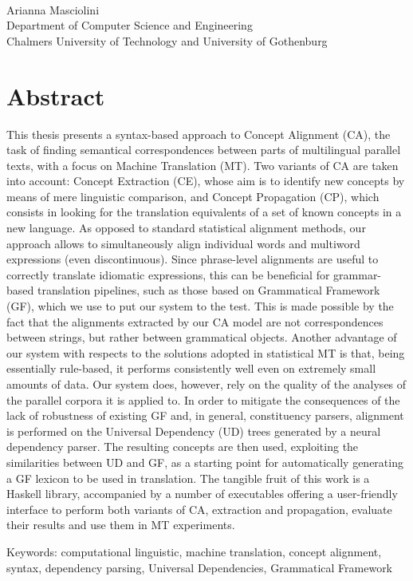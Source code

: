 \oneLineTitle\\
Arianna Masciolini\\
Department of Computer Science and Engineering\\
Chalmers University of Technology and University of Gothenburg\setlength{\parskip}{0.5cm}

\thispagestyle{plain}
\setlength{\parskip}{0pt plus 1.0pt}
\section*{Abstract}
This thesis presents a syntax-based approach to Concept Alignment (CA), the task of finding semantical correspondences between parts of multilingual parallel texts, with a focus on Machine Translation (MT).
Two variants of CA are taken into account: Concept Extraction (CE), whose aim is to identify new concepts by means of mere linguistic comparison, and Concept Propagation (CP), which consists in looking for the translation equivalents of a set of known concepts in a new language.
As opposed to standard statistical alignment methods, our approach allows to simultaneously align individual words and multiword expressions (even discontinuous). 
Since phrase-level alignments are useful to correctly translate idiomatic expressions, this can be beneficial for grammar-based translation pipelines, such as those based on Grammatical Framework (GF), which we use to put our system to the test. 
This is made possible by the fact that the alignments extracted by our CA model are not correspondences between strings, but rather between grammatical objects.
Another advantage of our system with respects to the solutions adopted in statistical MT is that, being essentially rule-based, it performs consistently well even on extremely small amounts of data.
Our system does, however, rely on the quality of the analyses of the parallel corpora it is applied to.
In order to mitigate the consequences of the lack of robustness of existing GF and, in general, constituency parsers, alignment is performed on the Universal Dependency (UD) trees generated by a neural dependency parser.
The resulting concepts are then used, exploiting the similarities between UD and GF, as a starting point for automatically generating a GF lexicon to be used in translation.
The tangible fruit of this work is a Haskell library, accompanied by a number of executables offering a user-friendly interface to perform both variants of CA, extraction and propagation, evaluate their results and use them in MT experiments.


\vfill
Keywords: computational linguistic, machine translation, concept alignment, syntax, dependency parsing, Universal Dependencies, Grammatical Framework

\newpage				%
\thispagestyle{empty}
\mbox{}